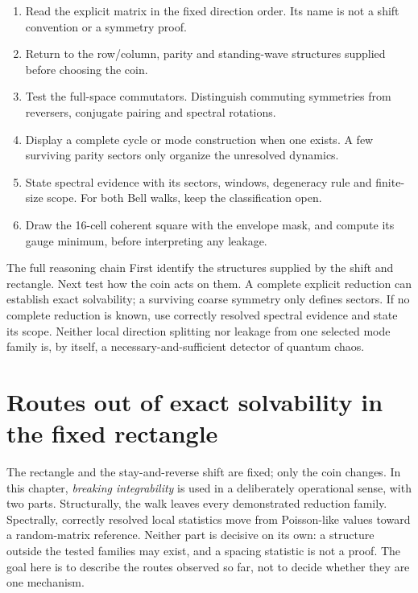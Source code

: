\documentclass[11pt,a4paper,oneside]{report}
\numberwithin{equation}{chapter}
\begin{document}
\begin{enumerate}
\item Read the explicit matrix in the fixed direction order.
Its name is not a shift convention or a symmetry proof.
\item Return to the row/column, parity and standing-wave structures
supplied before choosing the coin.
\item Test the full-space commutators. Distinguish commuting symmetries
from reversers, conjugate pairing and spectral rotations.
\item Display a complete cycle or mode construction when one exists.
A few surviving parity sectors only organize the unresolved dynamics.
\item State spectral evidence with its sectors, windows, degeneracy
rule and finite-size scope. For both Bell walks, keep the classification open.
\item Draw the 16-cell coherent square with the envelope mask, and compute
its gauge minimum, before interpreting any leakage.
\end{enumerate}

\begin{lesson}{The full reasoning chain}
First identify the structures supplied by the shift and rectangle.
Next test how the coin acts on them. A complete explicit reduction
can establish exact solvability; a surviving coarse symmetry only
defines sectors. If no complete reduction is known, use correctly
resolved spectral evidence and state its scope. Neither local
direction splitting nor leakage from one selected mode family is,
by itself, a necessary-and-sufficient detector of quantum chaos.
\end{lesson}



\chapter{Routes out of exact solvability in the fixed rectangle}
\label{ch:mechanisms}

The rectangle and the stay-and-reverse shift are fixed; only the coin
changes. In this chapter, \emph{breaking integrability} is used in a
deliberately operational sense, with two parts. Structurally, the walk
leaves every demonstrated reduction family. Spectrally, correctly
resolved local statistics move from Poisson-like values toward a
random-matrix reference. Neither part is decisive on its own: a structure
outside the tested families may exist, and a spacing statistic is not a
proof. The goal here is to describe the routes observed so far, not to
decide whether they are one mechanism.
\end{document}
